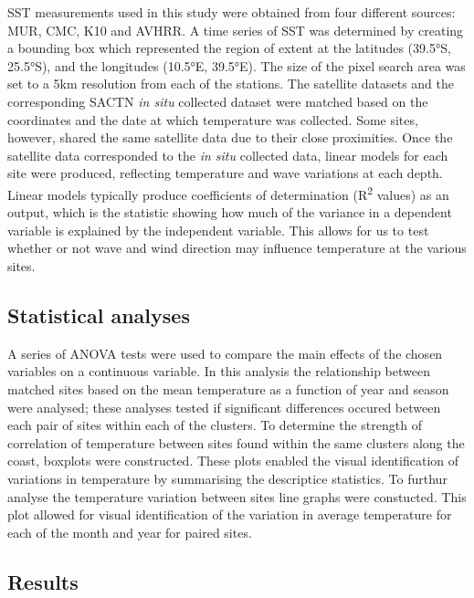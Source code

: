 \documentclass[12pt,a4paper,]{article}
\begin{document}
SST measurements used in this study were obtained from four different
sources: MUR, CMC, K10 and AVHRR. A time series of SST was determined by
creating a bounding box which represented the region of extent at the
latitudes (39.5°S, 25.5°S), and the longitudes (10.5°E, 39.5°E). The
size of the pixel search area was set to a 5km resolution from each of
the stations. The satellite datasets and the corresponding SACTN
\emph{in situ} collected dataset were matched based on the coordinates
and the date at which temperature was collected. Some sites, however,
shared the same satellite data due to their close proximities. Once the
satellite data corresponded to the \emph{in situ} collected data, linear
models for each site were produced, reflecting temperature and wave
variations at each depth. Linear models typically produce coefficients
of determination (R\textsuperscript{2} values) as an output, which is
the statistic showing how much of the variance in a dependent variable
is explained by the independent variable. This allows for us to test
whether or not wave and wind direction may influence temperature at the
various sites.

\hypertarget{statistical-analyses}{%
\subsection{Statistical analyses}\label{statistical-analyses}}

A series of ANOVA tests were used to compare the main effects of the
chosen variables on a continuous variable. In this analysis the
relationship between matched sites based on the mean temperature as a
function of year and season were analysed; these analyses tested if
significant differences occured between each pair of sites within each
of the clusters. To determine the strength of correlation of temperature
between sites found within the same clusters along the coast, boxplots
were constructed. These plots enabled the visual identification of
variations in temperature by summarising the descriptice statistics. To
furthur analyse the temperature variation between sites line graphs were
constucted. This plot allowed for visual identification of the variation
in average temperature for each of the month and year for paired sites.

\hypertarget{results}{%
\subsection{Results}\label{results}}
\end{document}
